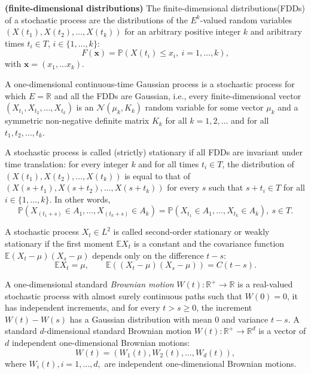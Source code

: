 \documentclass{article}
\begin{document}
\begin{definition} \textbf{(finite-dimensional distributions)}
The finite-dimensional distributions(FDDs) of a stochastic process are the distributions of the $E^k$-valued random variables $(X(t_1),X(t_2),\dots,X(t_k))$ for an arbitrary positive integer $k$ and aribitrary times $t_i \in T$, $i\in\{1,\dots,k\}$:
$$F(\boldsymbol{x})=\mathbb{P}(X(t_i) \leq x_i , \ i=1,\dots,k),$$
with $\boldsymbol{x}=(x_1,\dots x_k).$
\end{definition}
\begin{definition}
    A one-dimensional continuous-time Gaussian process is a stochastic process for which $E=\mathbb{R}$ and all the FDDs are Gaussian, i.e., every finite-dimensional vector $(X_{t_1},X_{t_2},\dots,X_{t_k})$ is an $\mathcal{N}(\mu_k,K_k)$ random variable for some vector $\mu_k$ and a symmetric non-negative definite matrix $K_k$ for all $k=1,2,\dots$ and for all $t_1,t_2,\dots,t_k$.
\end{definition}
\begin{definition}
    A stochastic process is called (strictly) stationary if all FDDs are invariant under time translation: for every integer $k$ and for all times $t_i\in T$, the distribution of $(X(t_1),X(t_2),\dots,X(t_k))$ is equal to that of $(X(s+t_1),X(s+t_2),\dots,X(s+t_k))$ for every $s$ such that $s+t_i \in T$ for all $i \in \{1,\dots,k\}$. In other words,
    $$\mathbb{P}(X_{(t_1+s)} \in A_1,\dots ,X_{(t_k+s)} \in A_k) = \mathbb{P}(X_{t_1} \in A_1, \dots, X_{t_k} \in A_k),\ s\in T.$$
\end{definition}

\begin{definition}
    A stochastic process $X_t \in L^2$ is called second-order stationary or weakly stationary if the first moment $\mathbb{E}X_t$ is a constant and the covariance function $\mathbb{E}(X_t-\mu)(X_s-\mu)$ depends only on the difference $t-s$:
    $$\mathbb{E}X_t=\mu,\qquad \mathbb{E}((X_t-\mu)(X_s-\mu))=C(t-s).$$
\end{definition}


\begin{definition}
    A one-dimensional standard \textit{Brownian motion} $W(t):\mathbb{R^+\to R}$ is a real-valued stochastic process with almost surely continuous paths such that $W(0)=0$, it has independent increments, and for every $t>s\geq0$, the increment $W(t)-W(s)$ has a Gaussian distribution with mean $0$ and variance $t-s$.
    A standard $d$-dimensional standard Brownian motion $W(t):\mathbb{R}^+\to \mathbb{R}^d$ is a vector of $d$ independent one-dimensional Brownian motions:
    $$W(t)=(W_1(t),W_2(t),\dots,W_d(t)),$$
    where $W_i(t), i=1,\dots,d,$ are independent one-dimensional Brownian motions.
\end{definition}
\end{document}
